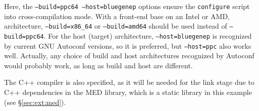 \documentclass[a4paper,10pt,twoside]{csshortdoc}
\begin{document}

Here, the \texttt{--build=ppc64 --host=bluegenep} options ensure the
\texttt{configure} script into cross-compilation mode.
With a front-end base on an Intel or AMD, architecture,
\texttt{--build=x86\_64} or \texttt{--build=amd64} should be used
instead of \texttt{--build=ppc64}. For the host (target) architecture,
\texttt{--host=bluegenep} is recognized by current GNU Autoconf versions,
so it is preferred, but \texttt{--host=ppc} also works well. Actually,
any choice of build and host architectures recognized by Autoconf would
probably work, as long as build and host are different.

The C++ compiler is also specified, as it will be needed for
the link stage due to C++ dependencies in the MED library,
which is a static library in this example (see \S\ref{sec:ext:med}).
\end{document}
